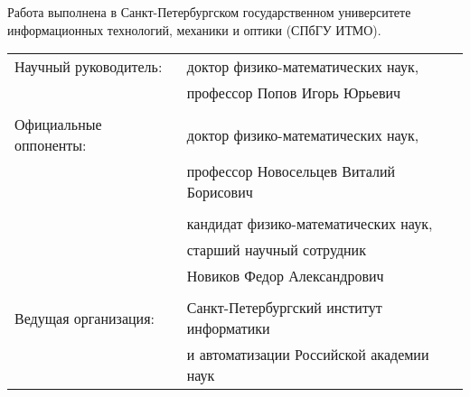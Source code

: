 \documentclass[12pt,a4paper]{article}
\date{}
\theoremstyle{definition}
\theoremstyle{plain}
\begin{document}
\newpage
{}


\thispagestyle{empty}
\addtocounter{page}{1}

\newpage

\thispagestyle{empty}
\noindent 
Работа выполнена в Санкт-Петербургском государственном университете информационных технологий, механики и оптики (СПбГУ ИТМО).

\vspace*{\fill}

\noindent
\begin{tabular}{ll}
Научный руководитель:  & доктор физико-математических наук,  				 \\
                       & профессор Попов Игорь Юрьевич         				 \\
                       & \\
Официальные оппоненты: & доктор физико-математических наук, \\
                       & профессор Новосельцев Виталий Борисович\\
                       & \\
                       & кандидат физико-математических наук,\\
                       & старший научный сотрудник\\
                       & Новиков Федор Александрович\\
                       & \\
Ведущая организация:   & Санкт-Петербургский институт информатики \\
					   & и автоматизации Российской академии наук\\
\end{tabular}
\end{document}
